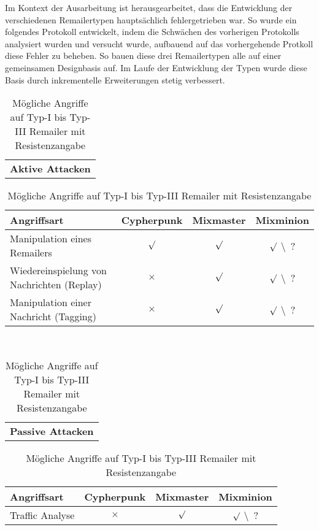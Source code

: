 Im Kontext der Ausarbeitung ist herausgearbeitet, dass die Entwicklung der verschiedenen Remailertypen hauptsächlich fehlergetrieben war. So wurde ein folgendes Protokoll entwickelt, indem die Schwächen des vorherigen Protokolls analysiert wurden und versucht wurde, aufbauend auf das vorhergehende Protkoll diese Fehler zu beheben. So bauen diese drei Remailertypen alle auf einer gemeinsamen Designbasis auf. Im Laufe der Entwicklung der Typen wurde diese Basis durch inkrementelle Erweiterungen stetig verbessert.

\clearpage

\begin{table}[htbp]
	\centering
	\begin{tabular}{c}
		\textbf{Aktive Attacken}
	\end{tabular}
		
	\begin{tabular}{m{7.5cm} || c | c | c}
		\hline
		\textbf{Angriffsart} & \textbf{Cypherpunk} & \textbf{Mixmaster} & \textbf{Mixminion} \\
		\hline
		Manipulation eines Remailers & $\surd$ & $\surd$ & $\surd$ \textbackslash ~? \\
		Wiedereinspielung von Nachrichten (Replay) & $\times$ & $\surd$ & $\surd$ \textbackslash ~? \\
		Manipulation einer Nachricht (Tagging) & $\times$ & $\surd$ & $\surd$ \textbackslash ~? \\
	\end{tabular}

	~\\[1ex]

	\begin{tabular}{c}
		\textbf{Passive Attacken}
	\end{tabular}
	
	\begin{tabular}{m{7.5cm} || c | c | c}
		\hline
		\textbf{Angriffsart} & \textbf{Cypherpunk} & \textbf{Mixmaster} & \textbf{Mixminion} \\
		\hline
		Traffic Analyse & $\times$ & $\surd$ & $\surd$ \textbackslash ~? \\
	\end{tabular}

	\caption{Mögliche Angriffe auf Typ-I bis Typ-III Remailer mit Resistenzangabe}
\end{table}

